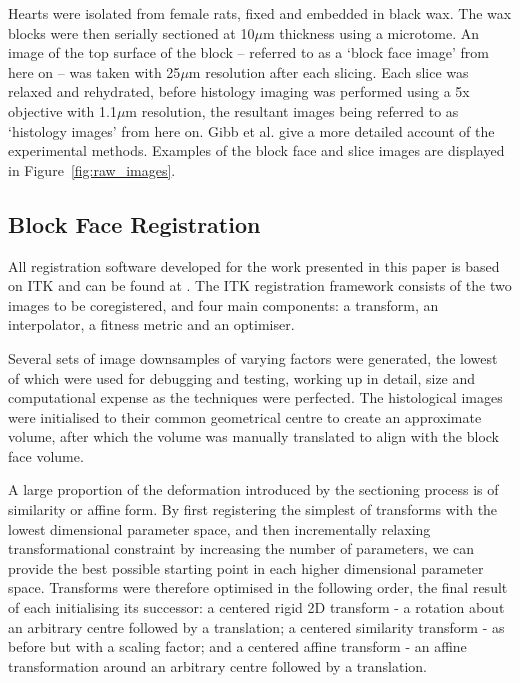     Hearts were isolated from female rats, fixed and embedded in black wax. The wax blocks were then serially sectioned at 10$\mu$m thickness using a microtome. An image of the top surface of the block -- referred to as a `block face image' from here on -- was taken with 25$\mu$m resolution after each slicing. Each slice was relaxed and rehydrated, before histology imaging was performed using a 5x objective with 1.1$\mu$m resolution, the resultant images being referred to as `histology images' from here on. Gibb et al. \cite{Gibb2012} give a more detailed account of the experimental methods. Examples of the block face and slice images are displayed in Figure~\ref{fig:raw_images}.
  
  \subsection{Block Face Registration} %
  \label{sub:block_face_registration}
    All registration software developed for the work presented in this paper is based on ITK \cite{Yoo2002} and can be found at \cite{github_registration}. The ITK registration framework consists of the two images to be coregistered, and four main components: a transform, an interpolator, a fitness metric and an optimiser.
    
    Several sets of image downsamples of varying factors were generated, the lowest of which were used for debugging and testing, working up in detail, size and computational expense as the techniques were perfected. The histological images were initialised to their common geometrical centre to create an approximate volume, after which the volume was manually translated to align with the block face volume.
    
    A large proportion of the deformation introduced by the sectioning process is of similarity or affine form. By first registering the simplest of transforms with the lowest dimensional parameter space, and then incrementally relaxing transformational constraint by increasing the number of parameters, we can provide the best possible starting point in each higher dimensional parameter space. Transforms were therefore optimised in the following order, the final result of each initialising its successor: a centered rigid 2D transform - a rotation about an arbitrary centre followed by a translation; a centered similarity transform - as before but with a scaling factor; and a centered affine transform - an affine transformation around an arbitrary centre followed by a translation.

